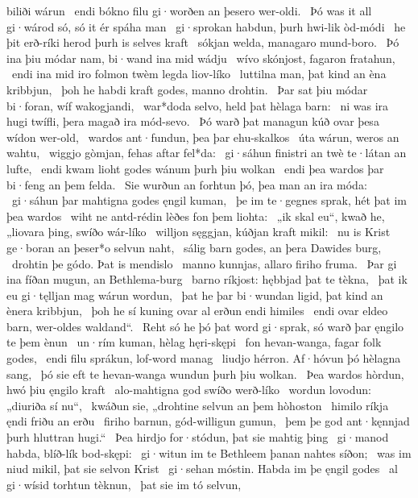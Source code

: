 biliði wárun \hld\ endi bókno filu
gi·worðen an þesero wer-oldi. \hld\ Þó was it all gi·wárod só,
só it ér spáha man \hld\ gi·sprokan habdun,
þurh hwi-lik òd-módi \hld\ he þit erð-ríki herod
þurh is selves kraft \hld\ sókjan welda,
managaro mund-boro. \hld\ Þó ina þiu módar nam,
bi·wand ina mid wádju \hld\ wívo skónjost,
fagaron fratahun, \hld\ endi ina mid iro folmon twèm
legda liov-líko \hld\ luttilna man,
þat kind an èna kribbjun, \hld\ þoh he habdi kraft godes,
manno drohtin. \hld\ Þar sat þiu módar bi·foran,
wíf wakogjandi, \hld\ war*doda selvo,
held þat hèlaga barn: \hld\ ni was ira hugi twífli,
þera magað ira mód-sevo. \hld\ Þó warð þat managun kúð
ovar þesa wídon wer-old, \hld\ wardos ant·fundun,
þea þar ehu-skalkos \hld\ úta wárun,
weros an wahtu, \hld\ wiggjo gòmjan,
fehas aftar fel*da: \hld\ gi·sáhun finistri an twè
te·látan an lufte, \hld\ endi kwam lioht godes
wánum þurh þiu wolkan \hld\ endi þea wardos þar
bi·feng an þem felda. \hld\ Sie wurðun an forhtun þó,
þea man an ira móda: \hld\ gi·sáhun þar mahtigna
godes ęngil kuman, \hld\ þe im te·gegnes sprak,
hét þat im þea wardos \hld\ wiht ne antd-rédin
lèðes fon þem liohta: \hld\ „ik skal eu“, kwað he, „liovara þing,
swíðo wár-líko \hld\ willjon sęggjan,
kúðjan kraft mikil: \hld\ nu is Krist ge·boran
an þeser*o selvun naht, \hld\ sálig barn godes,
an þera Dawides burg, \hld\ drohtin þe gódo.
Þat is mendislo \hld\ manno kunnjas,
allaro firiho fruma. \hld\ Þar gi ina fíðan mugun,
an Bethlema-burg \hld\ barno ríkjost:
hębbjad þat te tèkna, \hld\ þat ik eu gi·tęlljan mag
wárun wordun, \hld\ þat he þar bi·wundan ligid,
þat kind an ènera kribbjun, \hld\ þoh he sí kuning ovar al
erðun endi himiles \hld\ endi ovar eldeo barn,
wer-oldes waldand“. \hld\ Reht só he þó þat word gi·sprak,
só warð þar ęngilo te þem ènun \hld\ un·rím kuman,
hèlag hęri-skępi \hld\ fon hevan-wanga,
fagar folk godes, \hld\ endi filu sprákun,
lof-word manag \hld\ liudjo hérron.
Af·hóvun þó hèlagna sang, \hld\ þó sie eft te hevan-wanga
wundun þurh þiu wolkan. \hld\ Þea wardos hòrdun,
hwó þiu ęngilo kraft \hld\ alo-mahtigna god
swíðo werð-líko \hld\ wordun lovodun:
„diuriða sí nu“, \hld\ kwáðun sie, „drohtine selvun
an þem hòhoston \hld\ himilo ríkja
ęndi friðu an erðu \hld\ firiho barnun,
gód-willigun gumun, \hld\ þem þe god ant·kęnnjad
þurh hluttran hugi.“ \hld\ Þea hirdjo for·stódun,
þat sie mahtig þing \hld\ gi·manod habda,
blíð-lík bod-skępi: \hld\ gi·witun im te Bethleem þanan
nahtes síðon; \hld\ was im niud mikil,
þat sie selvon Krist \hld\ gi·sehan móstin.
Habda im þe ęngil godes \hld\ al gi·wísid%
torhtun tèknun, \hld\ þat sie im tó selvun,

